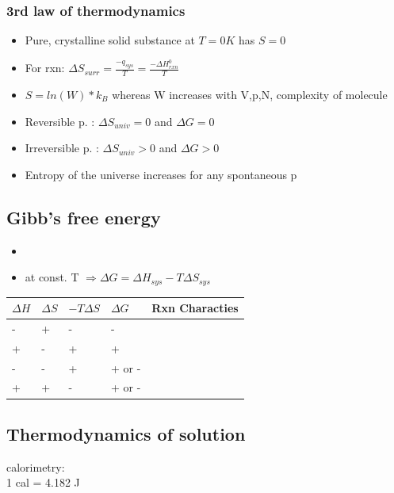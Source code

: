 \documentclass[ wastespaceontitle, english]{cheat_sheet_template}
\begin{document}
        \subsubsection{3rd law of thermodynamics}
            \begin{itemize}
                \item Pure, crystalline solid substance at $T=0K$ has $S=0$
                \item For rxn: $\Delta S_{surr} = \frac{-q_{sys}}{T} = \frac{- \Delta H_{rxn}^0}{T}$ 
                \item $S = ln(W)*k_B$ whereas W increases with V,p,N, complexity of molecule
                \item Reversible p. : $\Delta S_{univ} =0$ and $\Delta G = 0$
                \item Irreversible p. : $\Delta S_{univ} > 0$ and $\Delta G > 0$
                \item Entropy of the universe increases for any spontaneous p
            \end{itemize}
    \subsection{Gibb's free energy}
        \begin{itemize}
            \item {}
            \item at const. T $ \Rightarrow \Delta G= \Delta H_{sys} - T \Delta S_{sys}$
        \end{itemize}
        \begin{tabular*}{\linewidth}{l l l l l}
            $\Delta H$ & $\Delta S$ & $- T \Delta S$ & $\Delta G$ & Rxn Characties \\
            \hline
            - & + & - & - & \\
            + & - & + & + & \\
            - & - & + & + or - & \\
            + & + & - & + or - & 
        \end{tabular*}

     \subsection{Thermodynamics of solution}
     calorimetry:  \\
     1 cal = 4.182 J
     
\end{document}
